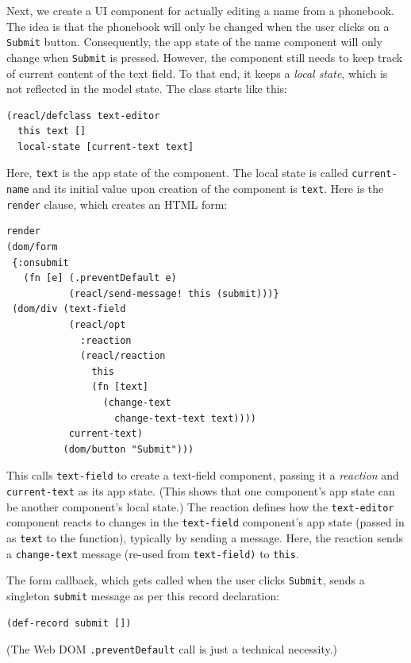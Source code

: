 \documentclass[sigplan,screen]{acmart}
\begin{document}
Next, we create a UI component for actually editing a name from a
phonebook.  The idea is that the phonebook will only be changed when
the user clicks on a \texttt{Submit} button.  Consequently, the app
state of the name component will only
change when \texttt{Submit} is pressed.  However, the component still
needs to keep track of current content of the text field.  To that
end, it keeps a \textit{local state}, which is not reflected in the
model state.  The class starts like this:
%
\begin{verbatim}
(reacl/defclass text-editor
  this text []
  local-state [current-text text]
\end{verbatim}
%
Here, \texttt{text} is the app state of the component.  The local
state is called \texttt{current-name} and its initial value upon
creation of the component is \texttt{text}.  Here is the
\texttt{render} clause, which creates an HTML form:
%
\begin{verbatim}
render
(dom/form
 {:onsubmit
   (fn [e] (.preventDefault e)
           (reacl/send-message! this (submit)))}
 (dom/div (text-field
           (reacl/opt
             :reaction
             (reacl/reaction
               this
               (fn [text]
                 (change-text
                   change-text-text text))))
           current-text)
          (dom/button "Submit")))
\end{verbatim}
%
This calls \texttt{text-field} to create a text-field component,
passing it a \textit{reaction} and \texttt{current-text} as its app
state.  (This shows that one component's app state can be another
component's local state.)  The reaction defines how the
\texttt{text-editor} component reacts to changes in the
\texttt{text-field} component's app state (passed in as \texttt{text}
to the function), typically by sending a message.  Here, the reaction
sends a \texttt{change-text} message (re-used from
\texttt{text-field)} to \texttt{this}.

The form callback, which gets called when the user clicks
\texttt{Submit}, sends a singleton \texttt{submit} message as per this
record declaration:
%
\begin{verbatim}
(def-record submit [])
\end{verbatim}
%
(The Web DOM \texttt{.preventDefault} call is just a technical necessity.)
\end{document}
